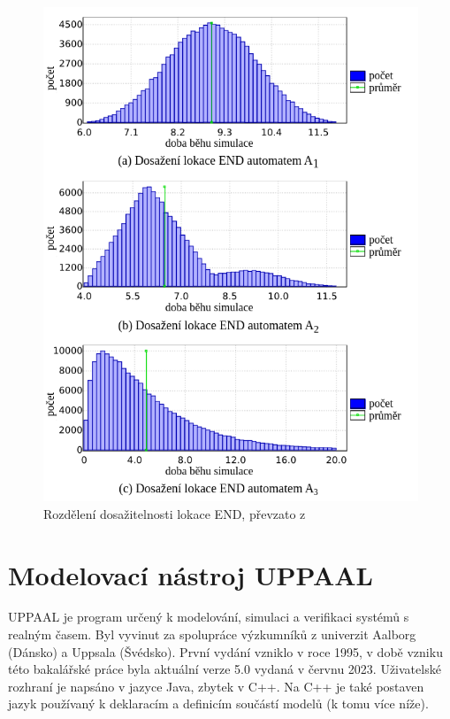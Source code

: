 \begin{figure}[H]
\begin{minipage}[b]{.49\linewidth}
    \includegraphics[width=\linewidth]{obrazky-figures/sta_reachability.png}
    \caption{Rozdělení dosažitelnosti lokace END, převzato z \cite{uppaal_smc}}
    \label{fig:sta_reachability}
  \end{minipage}\hfill
\end{figure}

\section{Modelovací nástroj UPPAAL} \label{uppaal}
UPPAAL je program určený k modelování, simulaci a verifikaci systémů s realným časem. Byl vyvinut za spolupráce výzkumníků z univerzit Aalborg (Dánsko) a Uppsala (Švédsko). První vydání vzniklo v roce 1995, v době vzniku této bakalářské práce byla aktuální verze 5.0 vydaná v červnu 2023. Uživatelské rozhraní je napsáno v jazyce Java, zbytek v C++. Na C++ je také postaven jazyk používaný k deklaracím a definicím součástí modelů (k tomu více níže).

